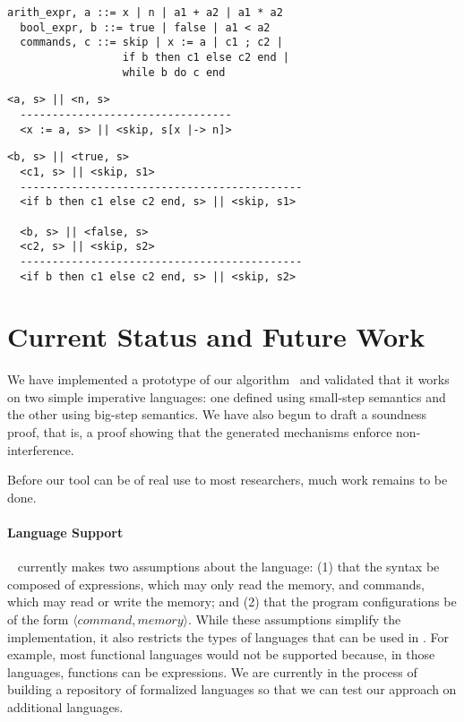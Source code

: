 \documentclass[sigplan,10pt]{acmart}\settopmatter{printfolios=true,printccs=false,printacmref=false}
\begin{document}
\begin{lstlisting}[captionpos=b,caption=Ott syntax of a simple imperative language]
  arith_expr, a ::= x | n | a1 + a2 | a1 * a2 
  bool_expr, b ::= true | false | a1 < a2
  commands, c ::= skip | x := a | c1 ; c2 | 
                  if b then c1 else c2 end | 
                  while b do c end   
\end{lstlisting}

\begin{lstlisting}[captionpos=b,caption={Ott big-step semantics of the assign command}]
  <a, s> || <n, s>
  ---------------------------------
  <x := a, s> || <skip, s[x |-> n]>
\end{lstlisting}

\begin{lstlisting}[captionpos=b,caption={Ott big-step semantics of the if command}]
  <b, s> || <true, s>
  <c1, s> || <skip, s1>
  --------------------------------------------
  <if b then c1 else c2 end, s> || <skip, s1>
  
  <b, s> || <false, s>
  <c2, s> || <skip, s2>
  --------------------------------------------
  <if b then c1 else c2 end, s> || <skip, s2>
\end{lstlisting}

\section{Current Status and Future Work}
We have implemented a prototype of our algorithm~\cite{GitHub:ott-ifc} and validated that it works on two simple imperative languages: one defined using small-step semantics and the other using big-step semantics. We have also begun to draft a soundness proof, that is, a proof showing that the generated mechanisms enforce non-interference.

Before our tool can be of real use to most researchers, much work remains to be done.

\paragraph{Language Support} \ottifc~ currently makes two assumptions about the language: (1) that the syntax be composed of expressions, which may only read the memory, and commands, which may read or write the memory; and (2) that the program configurations be of the form $\langle command, memory\rangle$. While these assumptions simplify the implementation, it also restricts the types of languages that can be used in \ottifc. For example, most functional languages would not be supported because, in those languages, functions can be expressions. We are currently in the process of building a repository of formalized languages so that we can test our approach on additional languages. 
\end{document}
